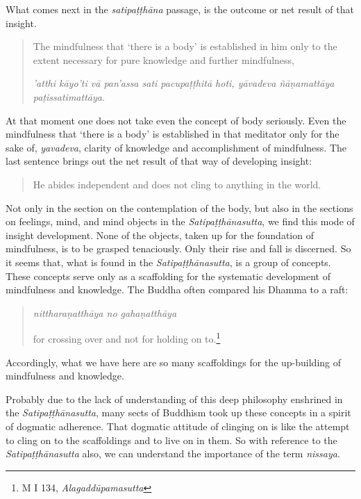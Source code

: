 What comes next in the \emph{satipaṭṭhāna} passage, is the outcome or net result of that insight.

\begin{quote}
The mindfulness that `there is a body' is established in him only to the extent necessary for pure knowledge and further mindfulness,

\emph{'atthi kāyo'ti vā pan'assa sati pacupaṭṭhitā hoti, yāvadeva ñāṇamattāya paṭissatimattāya}.
\end{quote}

At that moment one does not take even the concept of body seriously. Even the mindfulness that `there is a body' is established in that meditator only for the sake of, \emph{yavadeva}, clarity of knowledge and accomplishment of mindfulness. The last sentence brings out the net result of that way of developing insight:

\begin{quote}
He abides independent and does not cling to anything in the world.
\end{quote}

Not only in the section on the contemplation of the body, but also in the sections on feelings, mind, and mind objects in the \emph{Satipaṭṭhānasutta}, we find this mode of insight development. None of the objects, taken up for the foundation of mindfulness, is to be grasped tenaciously. Only their rise and fall is discerned. So it seems that, what is found in the \emph{Satipaṭṭhānasutta}, is a group of concepts. These concepts serve only as a scaffolding for the systematic development of mindfulness and knowledge. The Buddha often compared his Dhamma to a raft:

\begin{quote}
\emph{nittharaṇatthāya no gahaṇatthāya}

for crossing over and not for holding on to.\footnote{M I 134, \emph{Alagaddūpamasutta}}
\end{quote}

Accordingly, what we have here are so many scaffoldings for the up-building of mindfulness and knowledge.

Probably due to the lack of understanding of this deep philosophy enshrined in the \emph{Satipaṭṭhānasutta}, many sects of Buddhism took up these concepts in a spirit of dogmatic adherence. That dogmatic attitude of clinging on is like the attempt to cling on to the scaffoldings and to live on in them. So with reference to the \emph{Satipaṭṭhānasutta} also, we can understand the importance of the term \emph{nissaya}.
